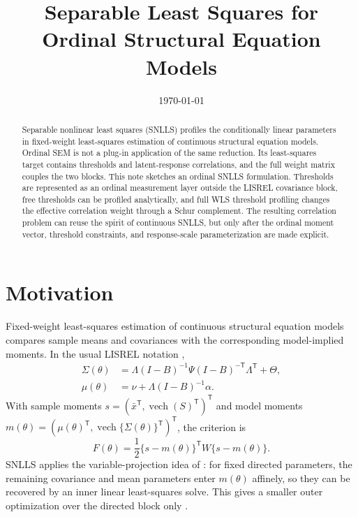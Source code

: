 \documentclass[11pt]{article}
\title{Separable Least Squares for Ordinal Structural Equation Models}
\author{}
\date{\today}
\newcommand{\vech}{\operatorname{vech}}
\newcommand{\trans}{^{\mathsf T}}
\begin{document}
\maketitle

\begin{abstract}
Separable nonlinear least squares (SNLLS) profiles the conditionally linear
parameters in fixed-weight least-squares estimation of continuous structural
equation models. Ordinal SEM is not a plug-in application of the same
reduction. Its least-squares target contains thresholds and latent-response
correlations, and the full weight matrix couples the two blocks. This note
sketches an ordinal SNLLS formulation. Thresholds are represented as an
ordinal measurement layer outside the LISREL covariance block, free thresholds
can be profiled analytically, and full WLS threshold profiling changes the
effective correlation weight through a Schur complement. The resulting
correlation problem can reuse the spirit of continuous SNLLS, but only after
the ordinal moment vector, threshold constraints, and response-scale
parameterization are made explicit.
\end{abstract}

\section{Motivation}
\label{sec:motivation}

Fixed-weight least-squares estimation of continuous structural equation models
compares sample means and covariances with the corresponding model-implied
moments. In the usual LISREL notation \citep{joreskog1996lisrel},
\begin{align}
  \Sigma(\theta)
    &=
    \Lambda(I-B)^{-1}\Psi(I-B)^{-\mathsf T}\Lambda\trans+\Theta, \\
  \mu(\theta)
    &=
    \nu+\Lambda(I-B)^{-1}\alpha.
\end{align}
With sample moments \(s=(\bar x\trans,\vech(S)\trans)\trans\) and model moments
\(m(\theta)=(\mu(\theta)\trans,\vech\{\Sigma(\theta)\}\trans)\trans\), the
criterion is
\begin{equation}
  F(\theta)
  =
  \frac{1}{2}\{s-m(\theta)\}\trans W\{s-m(\theta)\}.
  \label{eq:continuous-ls}
\end{equation}
SNLLS applies the variable-projection idea of
\citet{golub1973differentiation,golub2003separable}: for fixed directed
parameters, the remaining covariance and mean parameters enter
\(m(\theta)\) affinely, so they can be recovered by an inner linear
least-squares solve. This gives a smaller outer optimization over the directed
block only \citep{kreiberg2021cfa,kreiberg2023sem,ernst2023trek}.
\end{document}
